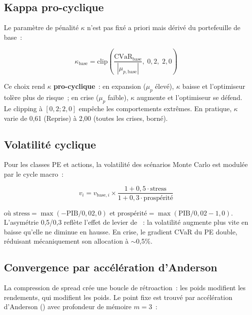 \documentclass[12pt, a4paper, twoside, openright]{report}
\theoremstyle{definition}
\begin{document}
\subsection{Kappa pro-cyclique}
\label{sec:kappa}

Le paramètre de pénalité $\kappa$ n'est pas fixé a priori mais dérivé du portefeuille de base~:

\begin{equation}
\kappa_{\text{base}} = \text{clip}\!\left(\frac{\text{CVaR}_{\text{base}}}{|\mu_{p,\text{base}}|}, \; 0{,}2, \; 2{,}0\right)
\label{eq:kappa}
\end{equation}

Ce choix rend $\kappa$ \textbf{pro-cyclique}~: en expansion ($\mu_p$ élevé), $\kappa$ baisse et l'optimiseur tolère plus de risque~; en crise ($\mu_p$ faible), $\kappa$ augmente et l'optimiseur se défend. Le clipping à $[0{,}2 ; 2{,}0]$ empêche les comportements extrêmes. En pratique, $\kappa$ varie de 0,61 (Reprise) à 2,00 (toutes les crises, borné).

\subsection{Volatilité cyclique}

Pour les classes PE et actions, la volatilité des scénarios Monte Carlo est modulée par le cycle macro~:

\begin{equation}
v_i = v_{\text{base},i} \times \frac{1 + 0{,}5 \cdot \text{stress}}{1 + 0{,}3 \cdot \text{prospérité}}
\label{eq:vol-cyclique}
\end{equation}

\noindent où $\text{stress} = \max(-\text{PIB}/0{,}02, 0)$ et $\text{prospérité} = \max(\text{PIB}/0{,}02 - 1, 0)$. L'asymétrie 0,5/0,3 reflète l'effet de levier de \citet{black1976}~: la volatilité augmente plus vite en baisse qu'elle ne diminue en hausse. En crise, le gradient CVaR du PE double, réduisant mécaniquement son allocation à $\sim$0,5\%.

\subsection{Convergence par accélération d'Anderson}

La compression de spread crée une boucle de rétroaction~: les poids modifient les rendements, qui modifient les poids. Le point fixe est trouvé par accélération d'Anderson (\citealt{walker2011}) avec profondeur de mémoire $m = 3$~:
\end{document}
